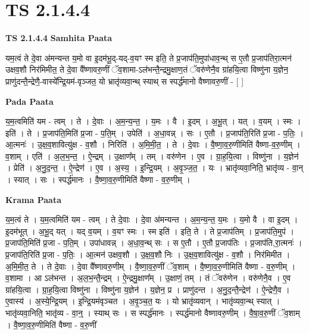 \documentclass[17pt]{extarticle}
\begin{document}
\section*{ TS 2.1.4.4 }

\textbf{TS 2.1.4.4 } \newline
\textbf{Samhita Paata} \newline

यम॒त्वं ते दे॒वा अ॑मन्यन्त य॒मो वा इ॒दम॑भू॒द्-यद्-व॒यꣳ स्म इति॒ ते प्र॒जाप॑ति॒मुपा॑धाव॒न्थ् स ए॒तौ प्र॒जाप॑तिरा॒त्मन॑ उक्षव॒शौ निर॑मिमीत॒ ते दे॒वा वै᳚ष्णावरु॒णीं ॅव॒शामा-ऽल॑भन्तै॒न्द्रमु॒क्षाण॒तं ॅवरु॑णेनै॒व ग्रा॑हयि॒त्वा विष्णु॑ना य॒ज्ञेन॒ प्राणु॑दन्तै॒न्द्रेणै॒-वास्ये᳚न्द्रि॒यम॑-वृञ्जत॒ यो भ्रातृ॑व्यवा॒न्थ् स्याथ् स स्पर्द्ध॑मानो वैष्णावरु॒णीं - [  ] \newline

\textbf{Pada Paata} \newline

य॒म॒त्वमिति॑ यम - त्वम् । ते । दे॒वाः । अ॒म॒न्य॒न्त॒ । य॒मः । वै । इ॒दम् । अ॒भू॒त् । यत् । व॒यम् । स्मः । इति॑ । ते । प्र॒जाप॑ति॒मिति॑ प्र॒जा - प॒ति॒म् । उपेति॑ । अ॒धा॒वन्न् । सः । ए॒तौ । प्र॒जाप॑ति॒रिति॑ प्र॒जा - प॒तिः॒ । आ॒त्मनः॑ । उ॒क्ष॒व॒शावित्यु॑क्ष - व॒शौ । निरिति॑ । अ॒मि॒मी॒त॒ । ते । दे॒वाः । वै॒ष्णा॒व॒रु॒णीमिति॑ वैष्णा-व॒रु॒णीम् । व॒शाम् । एति॑ । अ॒ल॒भ॒न्त॒ । ऐ॒न्द्रम् । उ॒क्षाण᳚म् । तम् । वरु॑णेन । ए॒व । ग्रा॒ह॒यि॒त्वा । विष्णु॑ना । य॒ज्ञेन॑ । प्रेति॑ । अ॒नु॒द॒न्त॒ । ऐ॒न्द्रेण॑ । ए॒व । अ॒स्य॒ । इ॒न्द्रि॒यम् । अ॒वृ॒ञ्ज॒त॒ । यः । भ्रातृ॑व्यवा॒निति॒ भ्रातृ॑व्य - वा॒न् । स्यात् । सः । स्पर्द्ध॑मानः । वै॒ष्णा॒व॒रु॒णीमिति॑ वैष्णा - व॒रु॒णीम् ।  \newline


\textbf{Krama Paata} \newline

य॒म॒त्वं ते । य॒म॒त्वमिति॑ यम - त्वम् । ते दे॒वाः । दे॒वा अ॑मन्यन्त । अ॒म॒न्य॒न्त॒ य॒मः । य॒मो वै । वा इ॒दम् । इ॒दम॑भूत् । अ॒भू॒द् यत् । यद् व॒यम् । व॒यꣳ स्मः । स्म इति॑ । इति॒ ते । ते प्र॒जाप॑तिम् । प्र॒जाप॑ति॒मुप॑ । प्र॒जाप॑ति॒मिति॑ प्र॒जा - प॒ति॒म् । उपा॑धावन्न् । अ॒धा॒व॒न्थ् सः । स ए॒तौ । ए॒तौ प्र॒जाप॑तिः । प्र॒जाप॑ति,रा॒त्मनः॑ । प्र॒जाप॑ति॒रिति॑ प्र॒जा - प॒तिः॒ । आ॒त्मन॑ उक्षव॒शौ । उ॒क्ष॒व॒शौ निः । उ॒क्ष॒व॒शावित्यु॑क्ष - व॒शौ । निर॑मिमीत । अ॒मि॒मी॒त॒ ते । ते दे॒वाः । दे॒वा वै᳚ष्णावरु॒णीम् । वै॒ष्णा॒व॒रु॒णीं ॅव॒शाम् । वै॒ष्णा॒व॒रु॒णीमिति॑ वैष्णा - व॒रु॒णीम् । व॒शामा । आ ऽल॑भन्त । अ॒ल॒भ॒न्तै॒न्द्रम् । ऐ॒न्द्रमु॒क्षाण᳚म् । उ॒क्षाणं॒ तम् । तं ॅवरु॑णेन । वरु॑णेनै॒व । ए॒व ग्रा॑हयि॒त्वा । ग्रा॒ह॒यि॒त्वा विष्णु॑ना । विष्णु॑ना य॒ज्ञेन॑ । य॒ज्ञेन॒ प्र । प्राणु॑दन्त । अ॒नु॒द॒न्तै॒न्द्रेण॑ । ऐ॒न्द्रेणै॒व । ए॒वास्य॑ । अ॒स्ये॒न्द्रि॒यम् । इ॒न्द्रि॒यम॑वृञ्चत । अ॒वृ॒ञ्च॒त॒ यः । यो भ्रातृ॑व्यवान् । भातृ॑व्यवा॒न्थ् स्यात् । भातृ॑व्यवा॒निति॒ भातृ॑व्य - वा॒न्॒ । स्याथ् सः । स स्पर्द्ध॑मानः । स्पर्द्ध॑मानो वैष्णावरु॒णीम् । वै॒षा॒॒व॒रु॒णीं ॅव॒शाम् । वै॒ष्णा॒व॒रु॒णीमिति॑ वैष्णा - व॒रु॒णीं \newline
\end{document}
